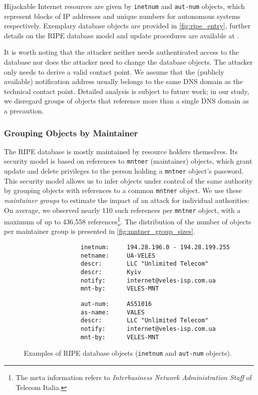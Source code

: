 \documentclass{llncs}
\let\orgautoref\autoref
\renewcommand{\autoref}
{\def\sectionautorefname{Section}\orgautoref}
\begin{document}
Hijackable Internet resources are given by \texttt{inetnum} and \texttt{aut-num} objects, which represent blocks of IP addresses and unique numbers for autonomous systems respectively. Exemplary database objects are provided in \autoref{fig:ripe_entry}, further details on the RIPE database model and update procedures are available at \cite{ripespec}.

It is worth noting that the attacker neither needs authenticated access to the database nor does the attacker need to change the database objects. The attacker only needs to derive a valid contact point. We assume that the (publicly available) notification address usually belongs to the same DNS domain as the technical contact point. Detailed analysis is subject to future work; in our study, we disregard groups of objects that reference more than a single DNS domain as a precaution.


\subsubsection{Grouping Objects by Maintainer} \label{sec:grouping}

The RIPE database is mostly maintained by resource holders themselves. Its security model is based on references to \texttt{mntner} (maintainer) objects, which grant update and delete privileges to the person holding a \texttt{mntner} object's password. This security model allows us to infer objects under control of the same authority by grouping objects with references to a common \texttt{mntner} object. We use these \textit{maintainer groups} to estimate the impact of an attack for individual authorities: On average, we observed nearly 110 such references per \texttt{mntner} object, with a maximum of up to 436,558 references\footnote{The meta information refers to \textit{Interbusiness Network Administration Staff} of Telecom Italia.}. The distribution of the number of objects per maintainer group is presented in \autoref{fig:mntner_group_sizes}.

\begin{figure}[t!]
\begin{verbatim}
                inetnum:     194.28.196.0 - 194.28.199.255
                netname:     UA-VELES
                descr:       LLC "Unlimited Telecom"
                descr:       Kyiv
                notify:      internet@veles-isp.com.ua
                mnt-by:      VELES-MNT
\end{verbatim}
\begin{verbatim}
                aut-num:     AS51016
                as-name:     VALES
                descr:       LLC "Unlimited Telecom"
                notify:      internet@veles-isp.com.ua
                mnt-by:      VELES-MNT
\end{verbatim}
\vspace{-9pt}
\caption{Examples of RIPE database objects (\texttt{inetnum} and \texttt{aut-num} objects).}\label{fig:ripe_entry}
\end{figure}
\end{document}
